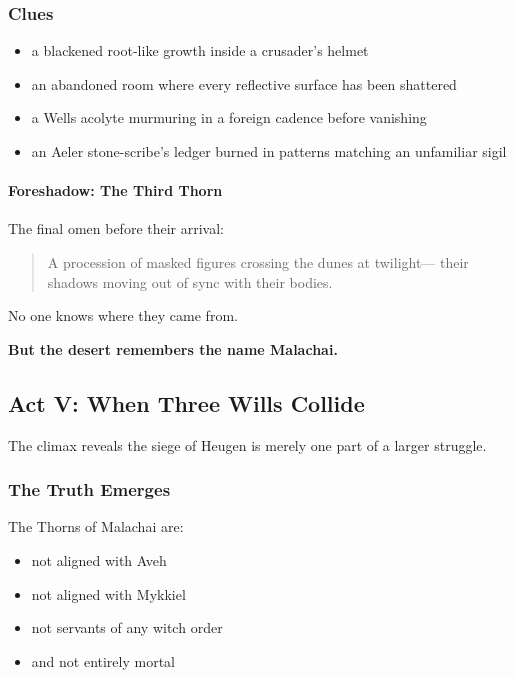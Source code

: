 \documentclass[11pt]{book}
\begin{document}
\subsubsection*{Clues}
\begin{itemize}[leftmargin=*]
    \item a blackened root-like growth inside a crusader's helmet  
    \item an abandoned room where every reflective surface has been shattered  
    \item a Wells acolyte murmuring in a foreign cadence before vanishing  
    \item an Aeler stone-scribe's ledger burned in patterns matching an unfamiliar sigil  
\end{itemize}

\paragraph{Foreshadow: The Third Thorn}  
The final omen before their arrival:
\begin{quote}
A procession of masked figures crossing the dunes at twilight---  
their shadows moving out of sync with their bodies.
\end{quote}

No one knows where they came from.

\textbf{But the desert remembers the name Malachai.}

\subsection{Act V: When Three Wills Collide}

The climax reveals the siege of Heugen is merely one part of a larger struggle.

\subsubsection*{The Truth Emerges}
The Thorns of Malachai are:
\begin{itemize}[leftmargin=*]
    \item not aligned with Aveh  
    \item not aligned with Mykkiel  
    \item not servants of any witch order  
    \item and not entirely mortal  
\end{itemize}
\end{document}
